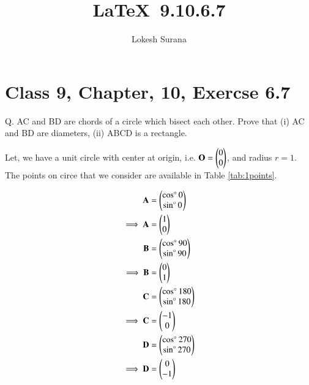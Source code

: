 \documentclass[journal,12pt,twocolumn]{IEEEtran}
\let\vec\mathbf
\begin{document}
\vspace{3cm}
\title{\LaTeX\ 9.10.6.7}
\author{Lokesh Surana}
\maketitle
\section*{Class 9, Chapter, 10, Exercse 6.7}

Q. AC and BD are chords of a circle which bisect each other. Prove that (i) AC and BD are diameters, (ii) ABCD is a rectangle.

\solution
Let, we have a unit circle with center at origin, i.e. $\vec{O} = \myvec{0\\0}$, and radius $r = 1$.
The points on circe that we consider are available in Table \eqref{tab:1points}.

\begin{table}[ht!]

\caption{}
\label{tab:points}
\end{table}

\begin{align}
    \vec{A} &= \myvec{\cos\degree0 \\ \sin\degree0} \\
    \implies \vec{A} &= \myvec{1 \\ 0} \\
    \vec{B} &= \myvec{\cos\degree90 \\ \sin\degree90} \\
    \implies \vec{B} &= \myvec{0 \\ 1} \\
    \vec{C} &= \myvec{\cos\degree180 \\ \sin\degree180} \\
    \implies \vec{C} &= \myvec{-1 \\ 0} \\
    \vec{D} &= \myvec{\cos\degree270 \\ \sin\degree270} \\
    \implies \vec{D} &= \myvec{0 \\ -1}
\end{align}
\end{document}
